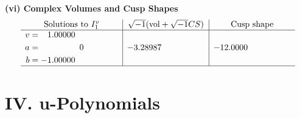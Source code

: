 \documentclass[1p]{elsarticle_modified}
\theoremstyle{definition}
\newcommand{\I}{\sqrt{-1}}
\begin{document}
\newpage\flushleft \textbf{(vi) Complex Volumes and Cusp Shapes}
$$\begin{array}{c|c|c}  
\text{Solutions to }I^v_{1}& \I (\text{vol} + \sqrt{-1}CS) & \text{Cusp shape}\\
 \hline 
\begin{aligned}
v &= \phantom{-}1.00000\phantom{ +0.000000I} \\
a &= \phantom{-0.000000 } 0 \\
b &= -1.00000\phantom{ +0.000000I}\end{aligned}
 & -3.28987\phantom{ +0.000000I} & -12.0000\phantom{ +0.000000I}\\
 \hline 
 \end{array}$$\newpage
\newpage\renewcommand{\arraystretch}{1}
\centering \section*{ IV. u-Polynomials}
\end{document}
